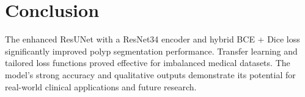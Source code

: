 \documentclass[12pt,a4paper]{article}
\begin{document}
\section{Conclusion}
The enhanced ResUNet with a ResNet34 encoder and hybrid BCE + Dice loss significantly improved polyp segmentation performance. Transfer learning and tailored loss functions proved effective for imbalanced medical datasets. The model’s strong accuracy and qualitative outputs demonstrate its potential for real-world clinical applications and future research.
\end{document}
